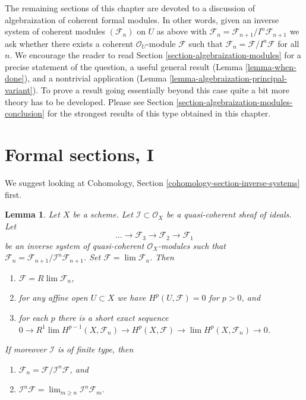 \documentclass{stacks-project}
\theoremstyle{plain}
\newtheorem{lemma}[subsection]{Lemma}
\theoremstyle{definition}
\theoremstyle{remark}
\numberwithin{equation}{subsection}
\def\lim{\mathop{\mathrm{lim}}\nolimits}
\begin{document}
\medskip\noindent
The remaining sections of this chapter are devoted to a discussion
of algebraization of coherent formal modules. In other words, given
an inverse system of coherent modules $(\mathcal{F}_n)$ on $U$
as above with
$\mathcal{F}_n = \mathcal{F}_{n + 1}/I^n\mathcal{F}_{n + 1}$
we ask whether there exists a coherent $\mathcal{O}_U$-module
$\mathcal{F}$ such that
$\mathcal{F}_n = \mathcal{F}/I^n\mathcal{F}$
for all $n$. We encourage the reader to read
Section \ref{section-algebraization-modules}
for a precise statement of the question, a useful general result
(Lemma \ref{lemma-when-done}), and a nontrivial application
(Lemma \ref{lemma-algebraization-principal-variant}).
To prove a result going essentially beyond this case
quite a bit more theory has to be developed.
Please see Section \ref{section-algebraization-modules-conclusion}
for the strongest results of this type obtained in this chapter.



\section{Formal sections, I}
\label{section-ML-degree-zero}

\noindent
We suggest looking at
Cohomology, Section \ref{cohomology-section-inverse-systems} first.

\begin{lemma}
\label{lemma-properties-system}
Let $X$ be a scheme. Let $\mathcal{I} \subset \mathcal{O}_X$
be a quasi-coherent sheaf of ideals. Let
$$
\ldots \to \mathcal{F}_3 \to \mathcal{F}_2 \to \mathcal{F}_1
$$
be an inverse system of quasi-coherent $\mathcal{O}_X$-modules
such that
$\mathcal{F}_n = \mathcal{F}_{n + 1}/\mathcal{I}^n\mathcal{F}_{n + 1}$.
Set $\mathcal{F} = \lim \mathcal{F}_n$. Then
\begin{enumerate}
\item $\mathcal{F} = R\lim \mathcal{F}_n$,
\item for any affine open $U \subset X$ we have
$H^p(U, \mathcal{F}) = 0$ for $p > 0$, and
\item for each $p$ there is a short exact sequence
$0 \to R^1\lim H^{p - 1}(X, \mathcal{F}_n) \to
H^p(X, \mathcal{F}) \to \lim H^p(X, \mathcal{F}_n) \to 0$.
\end{enumerate}
If moreover $\mathcal{I}$ is of finite type, then
\begin{enumerate}
\item[(4)]
$\mathcal{F}_n = \mathcal{F}/\mathcal{I}^n\mathcal{F}$, and
\item[(5)]
$\mathcal{I}^n \mathcal{F} = \lim_{m \geq n} \mathcal{I}^n\mathcal{F}_m$.
\end{enumerate}
\end{lemma}
\end{document}
